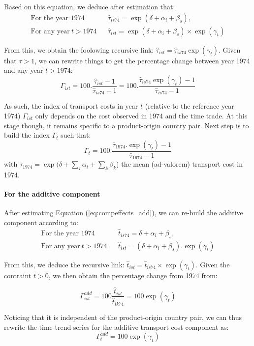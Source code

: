 \documentclass[a4paper,11pt]{article}
\begin{document}
Based on this equation, we deduce after estimation that:
\begin{eqnarray*}
\text{For the year 1974}&& \widehat{\tau}_{is74} = \exp(\delta +\alpha_i+\beta_s), \\
\text{For any year}~t> 1974&& \widehat{\tau}_{ist} = \exp(\delta +\alpha_i+\beta_s)\times \exp(\gamma_t)
\end{eqnarray*}

From this, we obtain the foolowing recursive link: $\widehat{\tau}_{ist} = \widehat{\tau}_{is74}\exp(\gamma_t)$. Given that $\tau >1$, we can rewrite things to get the percentage change between year 1974 and any year $t>1974$:
$$\Gamma_{ist} = 100.\frac{\widehat{\tau}_{ist}-1}{\widehat{\tau}_{is74}-1} = 100.\frac{\widehat{\tau}_{is74}\exp(\gamma_t)-1}{\widehat{\tau}_{is74}-1}$$

As such, the index of transport costs in year $t$ (relative to the reference year 1974) $\Gamma_{ist} $  only depends on the cost observed in 1974 and the time trade. At this stage though, it remains specific to a product-origin country pair. Next step is to build the index $\Gamma_t$ such that:
\begin{equation*}
 \Gamma_t= 100.\frac {\bar{\tau}_{1974}.\exp(\gamma_t)-1} {\bar{\tau}_{1974}-1}
\end{equation*}
\noindent with $\bar{\tau}_{1974} = \exp(\delta + \sum_i \alpha_i + \sum_k \beta_k$) the mean (ad-valorem) transport cost in 1974.

\paragraph{For the additive component} After estimating Equation (\ref{eq:compeffects_add}), we can re-build the additive component according to:
\begin{eqnarray*}
\text{For the year 1974}&&\widehat{t}_{is74}=  \delta + \alpha_i+ \beta_s, \\
\text{For any year}~t> 1974&&\widehat{t}_{ist}=\left(\delta + \alpha_i+ \beta_s\right).\exp(\gamma_t)
\end{eqnarray*}

From this, we deduce the recursive link: $\widehat{t}_{ist} = \widehat{t}_{is74} \times \exp(\gamma_t)$. Given the contraint $t>0$, we then obtain the percentage change from 1974 from:

\begin{equation*}
\Gamma^{add}_{ist} = 100\frac{\widehat{t}_{ist}}{\widehat{t}_{ik74}} = 100\exp(\gamma_t)
\end{equation*}

Noticing that it is independent of the product-origin country pair, we can thus rewrite the time-trend series for the additive transport cost component as:
$$\Gamma^{add}_t  = 100\exp(\gamma_t) $$
\end{document}
